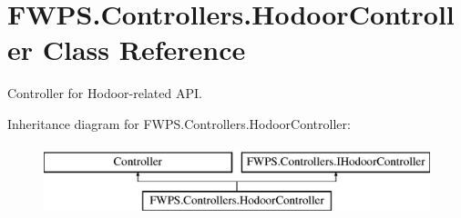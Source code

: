 \hypertarget{class_f_w_p_s_1_1_controllers_1_1_hodoor_controller}{}\section{F\+W\+P\+S.\+Controllers.\+Hodoor\+Controller Class Reference}
\label{class_f_w_p_s_1_1_controllers_1_1_hodoor_controller}


Controller for Hodoor-\/related A\+PI.  


Inheritance diagram for F\+W\+P\+S.\+Controllers.\+Hodoor\+Controller\+:\begin{figure}[H]
\begin{center}
\leavevmode
\includegraphics[height=2.000000cm]{class_f_w_p_s_1_1_controllers_1_1_hodoor_controller}
\end{center}
\end{figure}
